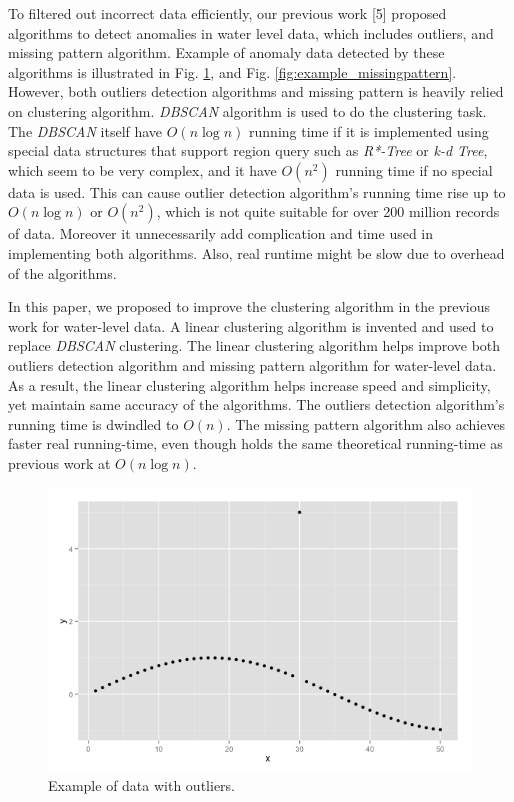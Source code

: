 \documentclass[conference]{IEEEtran}
\begin{document}
To filtered out incorrect data efficiently, our previous work [5] proposed algorithms to detect anomalies in water level data, which includes outliers, and missing pattern algorithm. Example of anomaly data detected by these algorithms is illustrated in Fig. \ref{fig:example_outliers}, and Fig. \ref{fig:example_missingpattern}. However, both outliers detection algorithms and missing pattern is heavily relied on clustering algorithm. \textit{DBSCAN} algorithm is used to do the clustering task. The \textit{DBSCAN} itself have $O(n\log{n})$ running time if it is implemented using special data structures that support region query such as \textit{R*-Tree} or \textit{k-d Tree}, which seem to be very complex, and it have $O(n^2)$ running time if no special data is used. This can cause outlier detection algorithm's running time rise up to $O(n\log{n})$ or $O(n^2)$, which is not quite suitable for over 200 million records of data. Moreover it unnecessarily add complication and time used in implementing both algorithms. Also, real runtime might be slow due to overhead of the algorithms.

In this paper, we proposed to improve the clustering algorithm in the previous work for water-level data. A linear clustering algorithm is invented and used to replace \textit{DBSCAN} clustering. The linear clustering algorithm helps improve both outliers detection algorithm and missing pattern algorithm for water-level data. As a result, the linear clustering algorithm helps increase speed and simplicity, yet maintain same accuracy of the algorithms. The outliers detection algorithm's running time is dwindled to $O(n)$. The missing pattern algorithm also achieves faster real running-time, even though holds the same theoretical running-time as previous work at $O(n\log{n})$.

\begin{figure}
	\includegraphics[width=\linewidth]{figure1.png}
	\caption{Example of data with outliers.}
	\label{fig:example_outliers}
\end{figure}
\end{document}
